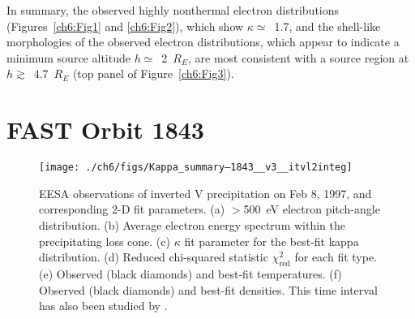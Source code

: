   In summary, the observed highly nonthermal electron distributions
  (Figures~\ref{ch6:Fig1} and \ref{ch6:Fig2}), which show $\kappa \simeq$~1.7,
  and the shell-like morphologies of the observed electron distributions, which
  appear to indicate a minimum source altitude $h \simeq$~2~$R_E$, are most
  consistent with a source region at $h \gtrsim$~4.7~$R_E$ (top panel of
  Figure~\ref{ch6:Fig3}).






  \section{FAST Orbit 1843}


  \begin{figure}
    \centering
    \noindent\texttt{[image: ./ch6/figs/Kappa\_summary--1843\_\_v3\_\_itvl2integ]}
    \caption[Inverted V precipitation and best-fit Maxwellian and kappa
    distribution parameters (Orbit 1843)]{EESA observations of inverted V
      precipitation on Feb 8, 1997, and corresponding 2-D fit parameters. (a)
      $>$500~eV electron pitch-angle distribution. (b) Average electron energy spectrum
      within the precipitating loss cone. (c) $\kappa$ fit parameter for the
      best-fit kappa distribution. (d) Reduced chi-squared statistic
      $\chi^2_{\mathrm{red}}$ for each fit type. (e) Observed (black diamonds)
      and best-fit temperatures. (f) Observed (black diamonds) and best-fit
      densities. This time interval has also been studied by
      \citet{Ergun1998a,Ergun1998}.}
    \label{ch6:Fig4}
  \end{figure}

